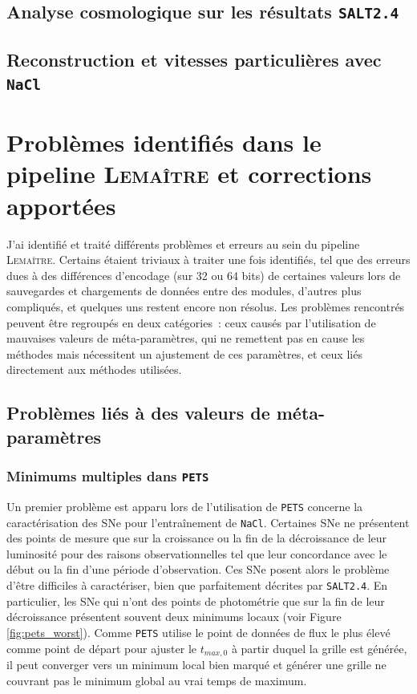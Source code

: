 \documentclass{book}
\def\lemaitre{\textsc{Lemaître}\xspace}
\def\pets{\texttt{PETS}\xspace}
\def\nacl{\texttt{NaCl}\xspace}
\def\saltd{\texttt{SALT2.4}\xspace}
\begin{document}


\subsection{Analyse cosmologique sur les résultats \saltd}


\subsection{Reconstruction et vitesses particulières avec \nacl}


\section{Problèmes identifiés dans le pipeline \lemaitre et corrections apportées}

J'ai identifié et traité différents problèmes et erreurs au sein du pipeline \lemaitre. Certains étaient triviaux à traiter une fois identifiés, tel que des erreurs dues à des différences d'encodage (sur 32 ou 64 bits) de certaines valeurs lors de sauvegardes et chargements de données entre des modules, d'autres plus compliqués, et quelques uns restent encore non résolus. Les problèmes rencontrés peuvent être regroupés en deux catégories~: ceux causés par l'utilisation de mauvaises valeurs de méta-paramètres, qui ne remettent pas en cause les méthodes mais nécessitent un ajustement de ces paramètres, et ceux liés directement aux méthodes utilisées.

\subsection{Problèmes liés à des valeurs de méta-paramètres}

\subsubsection{Minimums multiples dans \pets}
\label{sec:min_mult}

Un premier problème est apparu lors de l'utilisation de \pets concerne la caractérisation des SNe pour l'entraînement de \nacl. Certaines SNe ne présentent des points de mesure que sur la croissance ou la fin de la décroissance de leur luminosité pour des raisons observationnelles tel que leur concordance avec le début ou la fin d'une période d'observation. Ces SNe posent alors le problème d'être difficiles à caractériser, bien que parfaitement décrites par \saltd. En particulier, les SNe qui n'ont des points de photométrie que sur la fin de leur décroissance présentent souvent deux minimums locaux (voir Figure \ref{fig:pets_worst}). Comme \pets utilise le point de données de flux le plus élevé comme point de départ pour ajuster le $t_{max, 0}$ à partir duquel la grille est générée, il peut converger vers un minimum local bien marqué et générer une grille ne couvrant pas le minimum global au vrai temps de maximum.
\end{document}
